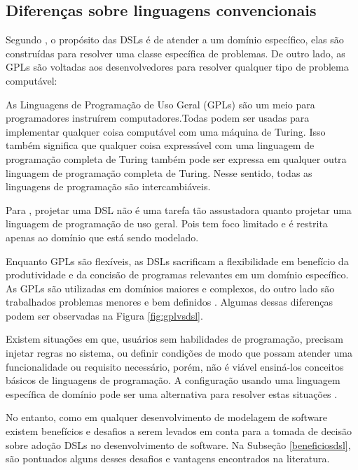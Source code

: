 \subsection{Diferenças sobre linguagens convencionais}
\label{diferencasdsl}

Segundo , o propósito das \gls{DSL}s é de atender a um domínio específico, elas são construídas para resolver uma classe específica de problemas. De outro lado, as \gls{GPL}s são voltadas aos desenvolvedores para resolver qualquer tipo de problema computável:

\begin{citacao}
As Linguagens de Programação de Uso Geral (GPLs) são um meio para programadores instruírem computadores.Todas podem ser usadas para implementar qualquer coisa computável com uma máquina de Turing. Isso também significa que qualquer coisa expressável com uma linguagem de programação completa de Turing também pode ser expressa em qualquer outra linguagem de programação completa de Turing. Nesse sentido, todas as linguagens de programação são intercambiáveis. \cite[p.27, tradução nossa]{dslengineering}
\end{citacao}

Para , projetar uma \gls{DSL} não é uma tarefa tão assustadora quanto projetar uma linguagem de programação de uso geral. Pois tem foco limitado e é restrita apenas ao domínio que está sendo modelado.

Enquanto \gls{GPL}s são flexíveis, as \gls{DSL}s sacrificam a flexibilidade em benefício da produtividade e da concisão de programas relevantes em um domínio específico. As \gls{GPL}s são utilizadas em domínios maiores e complexos, do outro lado são trabalhados problemas menores e bem definidos \cite{dslengineering}. Algumas dessas diferenças podem ser observadas na  Figura \ref{fig:gplvsdsl}.



Existem situações em que, usuários sem habilidades de programação, precisam injetar regras no sistema, ou definir condições de modo que possam atender uma funcionalidade ou requisito necessário, porém, não é viável ensiná-los conceitos básicos de linguagens de programação. A configuração usando uma linguagem específica de domínio pode ser uma alternativa para resolver estas situações \cite{novak2010easy}.  

No entanto, como em qualquer desenvolvimento de modelagem de software existem benefícios e desafios a serem levados em conta para a tomada de decisão sobre adoção \gls{DSL}s no desenvolvimento de software. Na Subseção \ref{beneficiosdsl}, são pontuados alguns desses desafios e vantagens encontrados na literatura.


